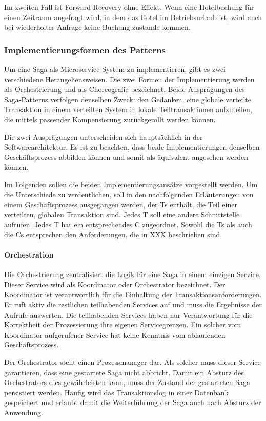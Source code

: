Im zweiten Fall ist Forward-Recovery ohne Effekt. Wenn eine Hotelbuchung für einen Zeitraum angefragt wird, in dem das Hotel im Betriebsurlaub ist, wird auch bei wiederholter Anfrage keine Buchung zustande kommen.

\subsubsection{Implementierungsformen des Patterns}\label{subs_Saga_Implementierungsformen}
Um eine Saga als Microservice-System zu implementieren, gibt es zwei verschiedene Herangehensweisen. Die zwei Formen der Implementierung werden als Orchestrierung und als Choreografie bezeichnet. Beide Ausprägungen des Saga-Patterns verfolgen denselben Zweck: den Gedanken, eine globale verteilte Transaktion in einem verteilten System in lokale Teiltransaktionen aufzuteilen, die mittels passender Kompensierung zurückgerollt werden können. 

Die zwei Ausprägungen unterscheiden sich hauptsächlich in der Softwarearchitektur. Es ist zu beachten, dass beide Implementierungen denselben Geschäftsprozess abbilden können und somit als äquivalent angesehen werden können. %

Im Folgenden sollen die beiden Implementierungsansätze vorgestellt werden. Um die Unterschiede zu verdeutlichen, soll in den nachfolgenden Erläuterungen von einem Geschäftsprozess ausgegangen werden, der Ts enthält, die Teil einer verteilten, globalen Transaktion sind. Jedes T soll eine andere Schnittstelle aufrufen. Jedes T hat ein entsprechendes C zugeordnet. Sowohl die Ts als auch die Cs entsprechen den Anforderungen, die in XXX beschrieben sind. %

\paragraph*{Orchestration}
Die Orchestrierung zentralisiert die Logik für eine Saga in einem einzigen Service. Dieser Service wird als Koordinator oder Orchestrator bezeichnet. Der Koordinator ist verantwortlich für die Einhaltung der Transaktionsanforderungen. Er ruft aktiv die restlichen teilhabenden Services auf und muss die Ergebnisse der Aufrufe auswerten. Die teilhabenden Services haben nur Verantwortung für die Korrektheit der Prozessierung ihre eigenen Servicegrenzen. Ein solcher vom Koordinator aufgerufener Service hat keine Kenntnis vom ablaufenden Geschäftsprozess. 

Der Orchestrator stellt einen Prozessmanager dar. Als solcher muss dieser Service garantieren, dass eine gestartete Saga nicht abbricht. Damit ein Absturz des Orchestrators dies gewährleisten kann, muss der Zustand der gestarteten Saga persistiert werden. Häufig wird das Transaktionslog in einer Datenbank gespeichert und erlaubt damit die Weiterführung der Saga auch nach Absturz der Anwendung. 


